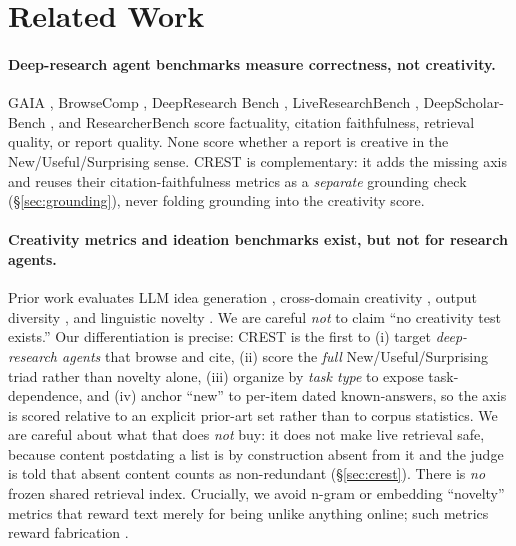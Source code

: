 \section{Related Work}
\label{sec:related}

\paragraph{Deep-research agent benchmarks measure correctness, not creativity.}
GAIA \citep{mialon2023gaia}, BrowseComp \citep{wei2025browsecomp}, DeepResearch Bench
\citep{du2025deepresearchbench}, LiveResearchBench \citep{liveresearchbench2025},
DeepScholar-Bench \citep{deepscholarbench2025}, and ResearcherBench \citep{researcherbench2025}
score factuality, citation faithfulness, retrieval quality, or report quality. None score whether
a report is creative in the New/Useful/Surprising sense. CREST is complementary: it adds the
missing axis and reuses their citation-faithfulness metrics as a \emph{separate} grounding
check (\S\ref{sec:grounding}), never folding grounding into the creativity score.

\paragraph{Creativity metrics and ideation benchmarks exist, but not for research agents.}
Prior work evaluates LLM idea generation \citep{si2024novel,ruan2024liveideabench}, cross-domain
creativity \citep{houcreativityprism2025}, output diversity \citep{zhang2025noveltybench}, and
linguistic novelty \citep{lu2024creativityindex}. We are careful \emph{not} to claim ``no
creativity test exists.'' Our differentiation is precise: CREST is the first to (i) target
\emph{deep-research agents} that browse and cite, (ii) score the \emph{full} New/Useful/Surprising
triad rather than novelty alone, (iii) organize by \emph{task type} to expose task-dependence, and
(iv) anchor ``new'' to per-item dated known-answers, so the axis is scored relative to an explicit
prior-art set rather than to corpus statistics. We are careful about what that does \emph{not} buy:
it does not make live retrieval safe, because content postdating a list is by construction absent
from it and the judge is told that absent content counts as non-redundant (\S\ref{sec:crest}). There
is \emph{no} frozen shared retrieval index.
Crucially, we avoid n-gram or embedding ``novelty'' metrics that reward text merely for being
unlike anything online; such metrics reward fabrication \citep{saakyan2026death,lu2024creativityindex}.

